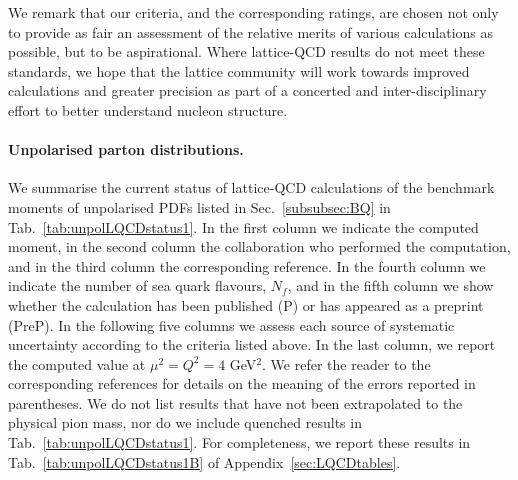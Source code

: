 We remark that our criteria, and the corresponding ratings, are chosen 
not only to provide as fair an assessment of the relative merits of various 
calculations as possible, but to be aspirational. 
%
Where lattice-QCD results do not meet these standards, we hope that the lattice 
community will work towards improved calculations and greater precision as 
part of a concerted and inter-disciplinary effort to better understand
nucleon structure.

\paragraph{Unpolarised parton distributions.}
We summarise the current status of lattice-QCD calculations of the benchmark 
moments of unpolarised PDFs listed in Sec.~\ref{subsubsec:BQ} in 
Tab.~\ref{tab:unpolLQCDstatus1}. 
%
In the first column we indicate the computed moment, in the second column
the collaboration who performed the computation, and in the third column
the corresponding reference.
%
In the fourth column we indicate the number of sea quark flavours, $N_f$, 
and in the fifth column we show whether the calculation has been published (P) 
or has appeared as a preprint (PreP).
%
In the following five columns we assess each source of systematic uncertainty
according to the criteria listed above. 
%
In the last column, we report the computed value at $\mu^2=Q^2=4$ GeV$^2$.
%
We refer the reader to the corresponding references for details on the 
meaning of the errors reported in parentheses.
%
We do not list results that have not been extrapolated to the physical pion 
mass, nor do we include quenched results in Tab.~\ref{tab:unpolLQCDstatus1}. 
%
For completeness, we report these results in Tab.~\ref{tab:unpolLQCDstatus1B} 
of Appendix~\ref{sec:LQCDtables}.

